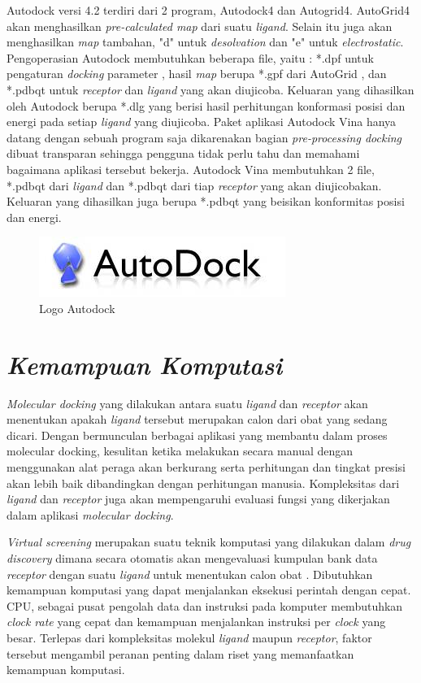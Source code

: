 Autodock versi 4.2 terdiri dari 2 program, Autodock4 dan Autogrid4. AutoGrid4 akan menghasilkan \textit{pre-calculated map} dari suatu \textit{ligand}. Selain itu juga akan menghasilkan \textit{map} tambahan, "d" untuk \textit{desolvation} dan "e" untuk \textit{electrostatic}. Pengoperasian Autodock membutuhkan beberapa file, yaitu : *.dpf untuk pengaturan \textit{docking} parameter , hasil \textit{map} berupa *.gpf dari AutoGrid , dan *.pdbqt untuk \textit{receptor} dan \textit{ligand} yang akan diujicoba. Keluaran yang dihasilkan oleh Autodock berupa *.dlg yang berisi hasil perhitungan konformasi posisi dan energi pada setiap \textit{ligand} yang diujicoba. Paket aplikasi Autodock Vina hanya datang dengan sebuah program saja dikarenakan bagian \textit{pre-processing docking} dibuat transparan sehingga pengguna tidak perlu tahu dan memahami bagaimana aplikasi tersebut bekerja. Autodock Vina membutuhkan 2 file, *.pdbqt dari \textit{ligand} dan *.pdbqt dari tiap \textit{receptor} yang akan diujicobakan. Keluaran yang dihasilkan juga berupa *.pdbqt yang beisikan konformitas posisi dan energi.
\begin{figure}
	\centering
	\includegraphics{autodock.jpg}
	\caption{Logo Autodock \cite{Logo autodock}}
\end{figure}

\section{\textit{Kemampuan Komputasi}}
\textit{Molecular docking} yang dilakukan antara suatu \textit{ligand} dan \textit{receptor} akan menentukan apakah \textit{ligand} tersebut merupakan calon dari obat yang sedang dicari. Dengan bermunculan berbagai aplikasi yang membantu dalam proses molecular docking, kesulitan ketika melakukan secara manual dengan menggunakan alat peraga akan berkurang serta perhitungan dan tingkat presisi akan lebih baik dibandingkan dengan perhitungan manusia. Kompleksitas dari \textit{ligand } dan \textit{receptor} juga akan mempengaruhi evaluasi fungsi yang dikerjakan dalam aplikasi \textit{molecular docking}\cite{MolecularDocking}.

\textit{Virtual screening} merupakan suatu teknik komputasi yang dilakukan dalam \textit{drug discovery} dimana secara otomatis akan mengevaluasi kumpulan bank data \textit{receptor} dengan suatu \textit{ligand} untuk menentukan calon obat \cite{virtual screening}. Dibutuhkan kemampuan komputasi yang dapat menjalankan eksekusi perintah dengan cepat. CPU, sebagai pusat pengolah data dan instruksi pada komputer membutuhkan \textit{clock rate} yang cepat dan kemampuan menjalankan instruksi per \textit{clock} yang besar. Terlepas dari kompleksitas molekul \textit{ligand} maupun \textit{receptor}, faktor tersebut mengambil peranan penting dalam riset yang memanfaatkan kemampuan komputasi.

